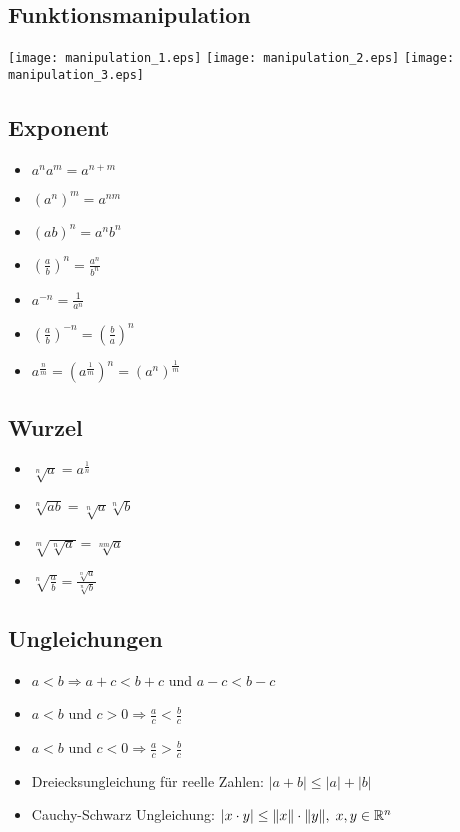 \subsection{Funktionsmanipulation}
\texttt{[image: manipulation\_1.eps]}
\texttt{[image: manipulation\_2.eps]}
\texttt{[image: manipulation\_3.eps]}

\begin{multicols}{2}

\subsection{Exponent}
\begin{itemize}[leftmargin=*]
  \item $a^n a^m = a^{n + m}$
  \item $(a^n)^m = a^{nm}$
  \item $(ab)^n = a^n b^n$
  \item $\left( \frac{a}{b} \right)^n = \frac{a^n}{b^n}$
  \item $a^{-n} = \frac{1}{a^n}$
  \item $\left( \frac{a}{b} \right)^{-n} = \left( \frac{b}{a} \right)^n$
  \item $a^\frac{n}{m} = (a^\frac{1}{m})^n = (a^n)^\frac{1}{m}$
\end{itemize}
\columnbreak

\subsection{Wurzel}
\begin{itemize}[leftmargin=*]
  \item $\sqrt[n]{a} = a^\frac{1}{n}$
  \item $\sqrt[n]{ab} = \sqrt[n]{a} \sqrt[n]{b}$
  \item $\sqrt[m]{\sqrt[n]{a}} = \sqrt[nm]{a}$
  \item $\sqrt[n]{\frac{a}{b}} = \frac{\sqrt[n]{a}}{\sqrt[n]{b}}$
\end{itemize}

\end{multicols}

\subsection{Ungleichungen}
\begin{itemize}[leftmargin=*]
  \item $a < b \Rightarrow a + c < b + c$ und $a - c < b - c$
  \item $a < b$ und $c > 0 \Rightarrow \frac{a}{c} < \frac{b}{c}$
  \item $a < b$ und $c < 0 \Rightarrow \frac{a}{c} > \frac{b}{c}$ 
  \item Dreiecksungleichung für reelle Zahlen: $|a+b| \le |a|{+}|b|$ %
  \item Cauchy-Schwarz Ungleichung: $|x \cdot y| \leq \|x\| \cdot \|y\|, \; x,y \in \mathbb{R}^n$
\end{itemize}

